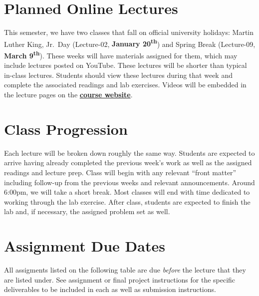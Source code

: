 \documentclass[
]{book}
\begin{document}
\hypertarget{planned-online-lectures}{%
\section{Planned Online Lectures}\label{planned-online-lectures}}

This semester, we have two classes that fall on official university holidays: Martin Luther King, Jr.~Day (Lecture-02, \textbf{January 20\textsuperscript{th}}) and Spring Break (Lecture-09, \textbf{March 9\textsuperscript{th}}). These weeks will have materials assigned for them, which may include lectures posted on YouTube. These lectures will be shorter than typical in-class lectures. Students should view these lectures during that week and complete the associated readings and lab exercises. Videos will be embedded in the lecture pages on the \href{https://slu-soc5650.github.io/}{\textbf{course website}}.

\hypertarget{class-progression}{%
\section{Class Progression}\label{class-progression}}

Each lecture will be broken down roughly the same way. Students are expected to arrive having already completed the previous week's work as well as the assigned readings and lecture prep. Class will begin with any relevant ``front matter'' including follow-up from the previous weeks and relevant announcements. Around 6:00pm, we will take a short break. Most classes will end with time dedicated to working through the lab exercise. After class, students are expected to finish the lab and, if necessary, the assigned problem set as well.

\hypertarget{assignment-due-dates}{%
\section{Assignment Due Dates}\label{assignment-due-dates}}

All assigments listed on the following table are due \emph{before} the lecture that they are listed under. See assignment or final project instructions for the specific deliverables to be included in each as well as submission instructions.
\end{document}
